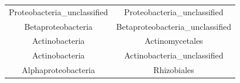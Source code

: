 \documentclass[]{article}
\begin{document}
\begin{longtable}[]{@{}cc@{}}
\begin{minipage}[t]{0.39\columnwidth}\centering\strut
Proteobacteria\_unclassified\strut
\end{minipage} & \begin{minipage}[t]{0.43\columnwidth}\centering\strut
Proteobacteria\_unclassified\strut
\end{minipage}\tabularnewline
\begin{minipage}[t]{0.39\columnwidth}\centering\strut
Betaproteobacteria\strut
\end{minipage} & \begin{minipage}[t]{0.43\columnwidth}\centering\strut
Betaproteobacteria\_unclassified\strut
\end{minipage}\tabularnewline
\begin{minipage}[t]{0.39\columnwidth}\centering\strut
Actinobacteria\strut
\end{minipage} & \begin{minipage}[t]{0.43\columnwidth}\centering\strut
Actinomycetales\strut
\end{minipage}\tabularnewline
\begin{minipage}[t]{0.39\columnwidth}\centering\strut
Actinobacteria\strut
\end{minipage} & \begin{minipage}[t]{0.43\columnwidth}\centering\strut
Actinobacteria\_unclassified\strut
\end{minipage}\tabularnewline
\begin{minipage}[t]{0.39\columnwidth}\centering\strut
Alphaproteobacteria\strut
\end{minipage} & \begin{minipage}[t]{0.43\columnwidth}\centering\strut
Rhizobiales\strut
\end{minipage}\tabularnewline
\bottomrule
\end{longtable}
\end{document}
